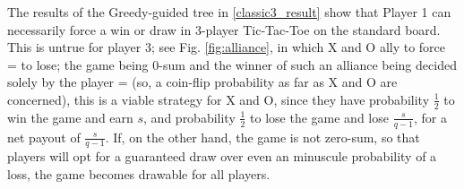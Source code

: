 \documentclass[12pt,a4paper]{article}
\begin{document}
The results of the Greedy-guided tree in \ref{classic3_result} show that Player 1 can necessarily force a win or draw in 3-player Tic-Tac-Toe on the standard board. This is untrue for player 3; see Fig. \ref{fig:alliance}, in which X and O ally to force = to lose; the game being 0-sum and the winner of such an alliance being decided solely by the player = (so, a coin-flip probability as far as X and O are concerned), this is a viable strategy for X and O, since they have probability $\frac{1}{2}$ to win the game and earn $s$, and probability $\frac{1}{2}$ to lose the game and lose $\frac{s}{q-1}$, for a net payout of  $\frac{s}{q-1}$. If, on the other hand, the game is not zero-sum, so that players will opt for a guaranteed draw over even an minuscule probability of a loss, the game becomes drawable for all players.
\end{document}
